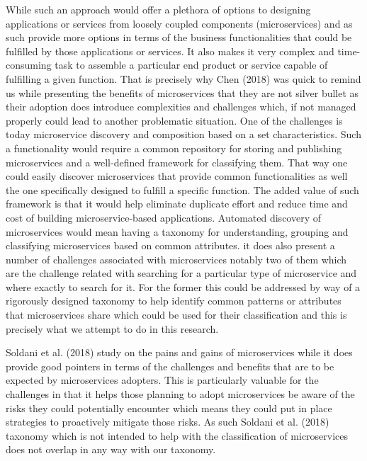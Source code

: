 \documentclass{article}
\begin{document}
While such an approach would offer a plethora of options to designing applications or services from loosely coupled components (microservices) and as such provide more options in terms of the business functionalities that could be fulfilled by those applications or services. It also makes it very complex and time-consuming task to assemble a particular end product or service capable of fulfilling a given function. That is precisely why Chen (2018) was quick to remind us while presenting the benefits of microservices that they are not silver bullet as their adoption does introduce complexities and challenges which, if not managed properly could lead to another problematic situation. One of the challenges is today microservice discovery and composition based on a set characteristics. Such a functionality would require a common repository for storing and publishing microservices and a well-defined framework for classifying them. That way one could easily discover microservices that provide common functionalities as well the one specifically designed to fulfill a specific function. The added value of such framework is that it would help eliminate duplicate effort and reduce time and cost of building microservice-based applications. Automated discovery of microservices would mean having a taxonomy for understanding, grouping and classifying microservices based on common attributes. it does also present a number of challenges associated with microservices notably two of them which are the challenge related with searching for a particular type of microservice and where exactly to search for it. For the former this could be addressed by way of a rigorously designed taxonomy to help identify common patterns or attributes that microservices share which could be used for their classification and this is precisely what we attempt to do in this research.

Soldani et al. (2018) study on the pains and gains of microservices while it does provide good pointers in terms of the challenges and benefits that are to be expected by microservices adopters. This is particularly valuable for the challenges in that it helps those planning to adopt microservices be aware of the risks they could potentially encounter which means they could put in place strategies to proactively mitigate those risks. As such Soldani et al. (2018) taxonomy which is not intended to help with the classification of microservices does not overlap in any way with our taxonomy. 
\end{document}
